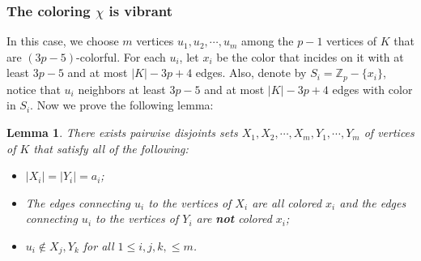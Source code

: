 \documentclass{article}
\numberwithin{table}{section}
\newtheorem{lemma}[theorem]{Lemma}
\begin{document}
\subsubsection{The coloring $\chi$ is vibrant}\label{subsec: vib}

In this case, we choose $m$ vertices $u_1,u_2,\cdots,u_m$ among the $p-1$ vertices of $K$ that are {$(3p-5)$-colorful}. For each $u_i$, let $x_i$ be the color that incides on it with at least $3p-5$ and at most $|K|-3p+4$ edges. Also, denote by $S_i = \mathbb{Z}_{p}-\{x_i\}$, notice that $u_i$ neighbors at least $3p-5$ and at most $|K|-3p+4$ edges with color in $S_i$. Now we prove the following lemma: 
\begin{lemma}
    There exists pairwise disjoints sets $X_1,X_2,\cdots,X_m,Y_1,\cdots,Y_m$ of vertices of $K$ that satisfy all of the following:
    \begin{itemize}
        \item $|X_i| = |Y_i| = a_i$;
        \item The edges connecting $u_i$ to the vertices of $X_i$ are all colored $x_i$ and the edges connecting $u_i$ to the vertices of $Y_i$ are \textbf{not} colored $x_i$;
        \item $u_i\notin X_j,Y_k$ for all $1\leq i,j,k,\leq m$.
    \end{itemize}
\end{lemma}
\end{document}
